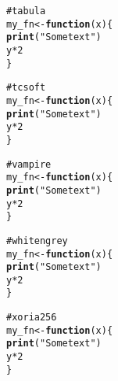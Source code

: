 \documentclass[12pt]{article}\usepackage{graphicx, color}
\makeatletter
\newcommand{\hlfunctioncall}[1]{\textcolor[rgb]{0.188235294117647,0.650980392156863,0.188235294117647}{\textbf{#1}}}%
\newcommand{\hlstring}[1]{\textcolor[rgb]{0.850980392156863,1,0.466666666666667}{#1}}%
\newcommand{\hlcomment}[1]{\textcolor[rgb]{0.533333333333333,0.533333333333333,0.533333333333333}{#1}}%
\newenvironment{kframe}{%
 \def\at@end@of@kframe{}%
 \ifinner\ifhmode%
  \def\at@end@of@kframe{\end{minipage}}%
  \begin{minipage}{\columnwidth}%
 \fi\fi%
 \def\FrameCommand##1{\hskip\@totalleftmargin \hskip-\fboxsep
 \colorbox{shadecolor}{##1}\hskip-\fboxsep
     \hskip-\linewidth \hskip-\@totalleftmargin \hskip\columnwidth}%
 \MakeFramed {\advance\hsize-\width
   \@totalleftmargin\z@ \linewidth\hsize
   \@setminipage}}%
 {\par\unskip\endMakeFramed%
 \at@end@of@kframe}
\newenvironment{knitrout}{}{} %
\makeatother
\begin{document}
\begin{knitrout}
\color{fgcolor}\begin{kframe}
\begin{alltt}
\hlcomment{# tabula}
my_fn <- \hlfunctioncall{function}(x) \{
    \hlfunctioncall{print}(\hlstring{"Some text"})
    y * 2
\}
\end{alltt}
\end{kframe}
\end{knitrout}





\begin{knitrout}
\color{fgcolor}\begin{kframe}
\begin{alltt}
\hlcomment{# tcsoft}
my_fn <- \hlfunctioncall{function}(x) \{
    \hlfunctioncall{print}(\hlstring{"Some text"})
    y * 2
\}
\end{alltt}
\end{kframe}
\end{knitrout}





\begin{knitrout}
\color{fgcolor}\begin{kframe}
\begin{alltt}
\hlcomment{# vampire}
my_fn <- \hlfunctioncall{function}(x) \{
    \hlfunctioncall{print}(\hlstring{"Some text"})
    y * 2
\}
\end{alltt}
\end{kframe}
\end{knitrout}





\begin{knitrout}
\color{fgcolor}\begin{kframe}
\begin{alltt}
\hlcomment{# whitengrey}
my_fn <- \hlfunctioncall{function}(x) \{
    \hlfunctioncall{print}(\hlstring{"Some text"})
    y * 2
\}
\end{alltt}
\end{kframe}
\end{knitrout}





\begin{knitrout}
\color{fgcolor}\begin{kframe}
\begin{alltt}
\hlcomment{# xoria256}
my_fn <- \hlfunctioncall{function}(x) \{
    \hlfunctioncall{print}(\hlstring{"Some text"})
    y * 2
\}
\end{alltt}
\end{kframe}
\end{knitrout}
\end{document}
